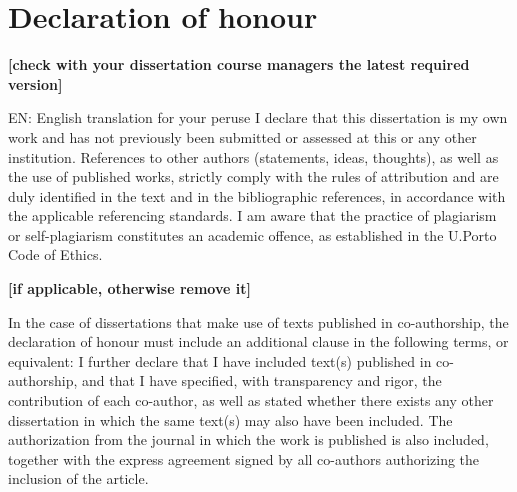 \chapter*{Declaration of honour}

\begin{center}
\textbf{[check with your dissertation course managers the latest required version]}
\end{center}
 EN: English translation for your peruse
I declare that this dissertation is my own work and has not previously been 
submitted or assessed at this or any other institution.
References to other authors (statements, ideas, thoughts), as well as the use 
of published works, strictly comply with the rules of attribution and are 
duly identified in the text and in the bibliographic references, in 
accordance with the applicable referencing standards.
I am aware that the practice of plagiarism or self-plagiarism constitutes 
an academic offence, as established in the U.Porto Code of Ethics.

\begin{center}
\textbf{[if applicable, otherwise remove it]}
\end{center}
In the case of dissertations that make use of texts published in 
co-authorship, the declaration of honour must include an additional 
clause in the following terms, or equivalent:
I further declare that I have included text(s) published in co-authorship, 
and that I have specified, with transparency and rigor, the contribution 
of each co-author, as well as stated whether there exists any other 
dissertation in which the same text(s) may also have been included.
The authorization from the journal in which the work is published is also 
included, together with the express agreement signed by all co-authors 
authorizing the inclusion of the article.

